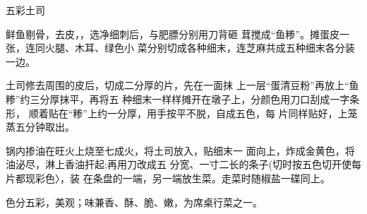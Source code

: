 \begin{recipe}{五彩土司}

\ingredients



\cooking

\step 	鲜鱼剔骨，去皮，，选净细刺后，与肥膘分别用刀背砸 茸搅成“鱼糁”。摊蛋皮一张，连同火腿、木耳、绿色小 菜分别切成各种细末，连芝麻共成五种细末各分装一边。

\step 	土司修去周围的皮后，切成二分厚的片，先在一面抹 上一层“蛋清豆粉”再放上“鱼糁”约三分厚抹平，再将五 种细末一样样摊开在墩子上，分颜色用刀口刮成一字条形， 顺着贴在“糁”上约一分厚，用手按平不脱，自成五色，每 片同样贴好，上笼蒸五分钟取出。

\step 	锅内掺油在旺火上烧至七成火，将土司放入，贴细末一 面向上，炸成金黄色，将油泌尽，淋上香油扞起;再用刀改成五 分宽、一寸二长的条子(切时按五色切开使每片都现彩色〉，装 在条盘的一端，另一端放生菜。走菜时随椒盐一碟同上。

\notes

色分五彩，美观；味兼香、酥、脆、嫩，为席桌行菜之一。

\end{recipe}

